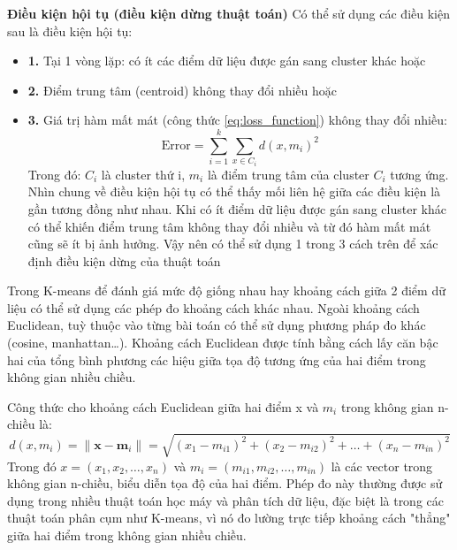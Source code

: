 \documentclass[a4paper]{article}
\begin{document}
\textbf{Điều kiện hội tụ (điều kiện dừng thuật toán)\cite{KMeansCluster}}
Có thể sử dụng các điều kiện sau là điều kiện hội tụ:
\begin{itemize}[label={}]
    \item \textbf{1. }Tại 1 vòng lặp: có ít các điểm dữ liệu được gán sang cluster khác hoặc
    \item \textbf{2. }Điểm trung tâm (centroid) không thay đổi nhiều hoặc
    \item \textbf{3. }Giá trị hàm mất mát (công thức \ref{eq:loss_function}) không thay đổi nhiều:
    \begin{equation}
        \text{Error} = \sum_{i=1}^{k} \sum_{x \in C_i} d(x, m_i)^2
        \label{eq:loss_function}
    \end{equation}
    Trong đó: $C_i$ là cluster thứ i, $m_i$  là điểm trung tâm của cluster $C_i$ tương ứng. \\
    Nhìn chung về điều kiện hội tụ có thể thấy mối liên hệ giữa các điều kiện là gần tương đồng như nhau. Khi có ít điểm dữ liệu được gán sang cluster khác có thể khiến điểm trung tâm không thay đổi nhiều và từ đó hàm mất mát cũng sẽ ít bị ảnh hưởng. Vậy nên có thể sử dụng 1 trong 3 cách trên để xác định điều kiện dừng của thuật toán
\end{itemize}
Trong K-means để đánh giá mức độ giống nhau hay khoảng cách giữa 2 điểm dữ liệu có thể sử dụng các phép đo khoảng cách khác nhau. Ngoài khoảng cách Euclidean, tuỳ thuộc vào từng bài toán có thể sử dụng phương pháp đo khác (cosine, manhattan…). Khoảng cách Euclidean được tính bằng cách lấy căn bậc hai của tổng bình phương các hiệu giữa tọa độ tương ứng của hai điểm trong không gian nhiều chiều.

Công thức cho khoảng cách Euclidean giữa hai điểm x và $m_i$ trong không gian n-chiều là:
\begin{equation}
    d(x, m_i) = \|\mathbf{x} - \mathbf{m}_i\| = \sqrt{(x_1 - m_{i1})^2 + (x_2 - m_{i2})^2 + \ldots + (x_n - m_{in})^2}
    \label{eq:euclidean}
\end{equation}
Trong đó \( x = (x_1, x_2, \ldots, x_n) \) và \( m_i = (m_{i1}, m_{i2}, \ldots, m_{in}) \) là các vector trong không gian n-chiều, biểu diễn tọa độ của hai điểm. Phép đo này thường được sử dụng trong nhiều thuật toán học máy và phân tích dữ liệu, đặc biệt là trong các thuật toán phân cụm như K-means, vì nó đo lường trực tiếp khoảng cách "thẳng" giữa hai điểm trong không gian nhiều chiều.
\end{document}
